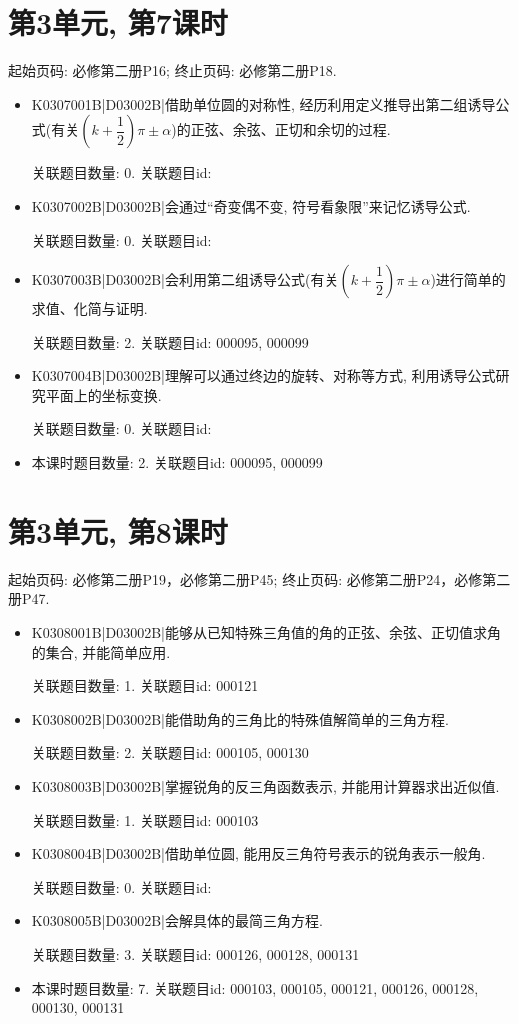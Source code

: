 \section*{第3单元, 第7课时}
起始页码: 必修第二册P16; 终止页码: 必修第二册P18.
\begin{itemize}
\item K0307001B|D03002B|借助单位圆的对称性, 经历利用定义推导出第二组诱导公式(有关$(k+\dfrac 12)\pi\pm \alpha$)的正弦、余弦、正切和余切的过程.

关联题目数量: 0. 关联题目id: 

\item K0307002B|D03002B|会通过``奇变偶不变, 符号看象限''来记忆诱导公式.

关联题目数量: 0. 关联题目id: 

\item K0307003B|D03002B|会利用第二组诱导公式(有关$(k+\dfrac 12)\pi\pm \alpha$)进行简单的求值、化简与证明.

关联题目数量: 2. 关联题目id: 000095, 000099

\item K0307004B|D03002B|理解可以通过终边的旋转、对称等方式, 利用诱导公式研究平面上的坐标变换.

关联题目数量: 0. 关联题目id: 

\item 本课时题目数量: 2. 关联题目id: 000095, 000099

\end{itemize}

\section*{第3单元, 第8课时}
起始页码: 必修第二册P19，必修第二册P45; 终止页码: 必修第二册P24，必修第二册P47.
\begin{itemize}
\item K0308001B|D03002B|能够从已知特殊三角值的角的正弦、余弦、正切值求角的集合, 并能简单应用.

关联题目数量: 1. 关联题目id: 000121

\item K0308002B|D03002B|能借助角的三角比的特殊值解简单的三角方程.

关联题目数量: 2. 关联题目id: 000105, 000130

\item K0308003B|D03002B|掌握锐角的反三角函数表示, 并能用计算器求出近似值.

关联题目数量: 1. 关联题目id: 000103

\item K0308004B|D03002B|借助单位圆, 能用反三角符号表示的锐角表示一般角.

关联题目数量: 0. 关联题目id: 

\item K0308005B|D03002B|会解具体的最简三角方程.

关联题目数量: 3. 关联题目id: 000126, 000128, 000131

\item 本课时题目数量: 7. 关联题目id: 000103, 000105, 000121, 000126, 000128, 000130, 000131

\end{itemize}

